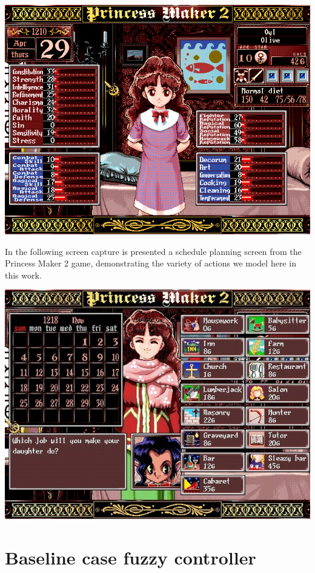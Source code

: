 \documentclass[12pt, a4paper]{report}
\begin{document}
	\includegraphics*[width=\textwidth, keepaspectratio=true]{code/pm2_attributes.png}
	
	In the following screen capture is presented a schedule planning screen from the Princess Maker 2 game, demonstrating the variety of actions we model here in this work.
	
	\includegraphics*[width=\textwidth, keepaspectratio=true]{code/pm2_actions.png}
		
	\chapter{Baseline case fuzzy controller}\label{appendix::baseline-case-fuzzy-controller}
	
	
	
\end{document}
